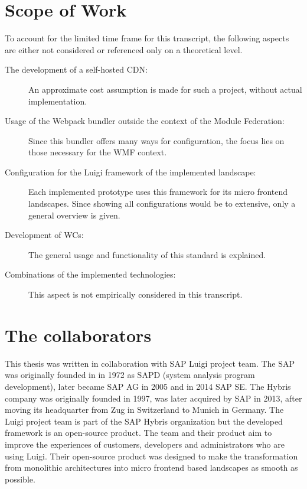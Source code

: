 \section{Scope of Work}

To account for the limited time frame for this transcript, the following aspects are either not considered or referenced only on a theoretical level.

\begin{description}
	\item[The development of a self-hosted CDN:] An approximate cost assumption is made for such a project, without actual implementation.
	\item[Usage of the Webpack bundler outside the context of the Module Federation:] Since this bundler offers many ways for configuration, the focus lies on those necessary for the WMF context. 
	\item[Configuration for the Luigi framework of the implemented landscape:] Each implemented prototype uses this framework for its micro frontend landscapes. Since showing all configurations would be to extensive, only a general overview is given. 
	\item[Development of WCs:] The general usage and functionality of this standard is explained. 
	\item[Combinations of the implemented technologies:] This aspect is not empirically considered in this transcript. 
\end{description}

\section{The collaborators}

This thesis was written in collaboration with SAP Luigi project team. The SAP was originally founded in in 1972 as SAPD (system analysis program development), later became SAP AG in 2005 and in 2014 SAP SE. The Hybris company was originally founded in 1997, was later acquired by SAP in 2013, after moving its headquarter from Zug in Switzerland to Munich in Germany.\cite{sap_history} The Luigi project team is part of the SAP Hybris organization but the developed framework is an open-source product. 
The team and their product aim to improve the experiences of customers, developers and administrators who are using Luigi. Their open-source product was designed to make the transformation from monolithic architectures into micro frontend based landscapes as smooth as possible. 

 
